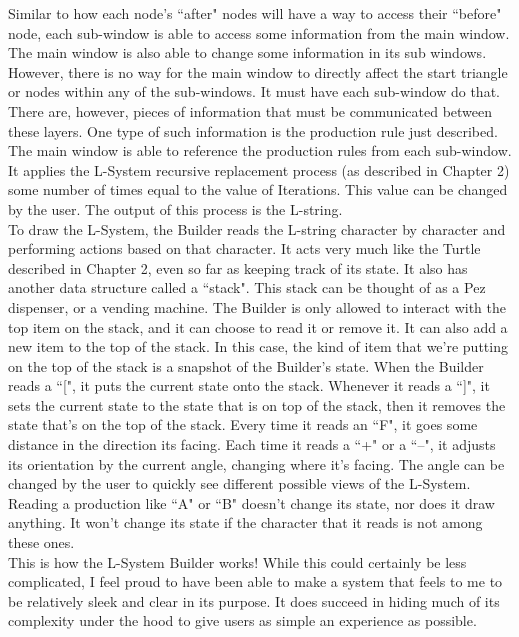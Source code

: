 \documentclass[12pt,twoside]{reedthesis}
\begin{document}
	Similar to how each node's ``after" nodes will have a way to access their ``before" node, each sub-window is able to access some information from the main window. The main window is also able to change some information in its sub windows. However, there is no way for the main window to directly affect the start triangle or nodes within any of the sub-windows. It must have each sub-window do that. There are, however, pieces of information that must be communicated between these layers. One type of such information is the production rule just described. The main window is able to reference the production rules from each sub-window. It applies the L-System recursive replacement process (as described in Chapter 2) some number of times equal to the value of Iterations. This value can be changed by the user. The output of this process is the L-string.\\
	
	To draw the L-System, the Builder reads the L-string character by character and performing actions based on that character. It acts very much like the Turtle described in Chapter 2, even so far as keeping track of its state. It also has another data structure called a ``stack". This stack can be thought of as a Pez dispenser, or a vending machine. The Builder is only allowed to interact with the top item on the stack, and it can choose to read it or remove it. It can also add a new item to the top of the stack. In this case, the kind of item that we're putting on the top of the stack is a snapshot of the Builder's state. When the Builder reads a ``[", it puts the current state onto the stack. Whenever it reads a ``]", it sets the current state to the state that is on top of the stack, then it removes the state that's on the top of the stack. Every time it reads an ``F", it goes some distance in the direction its facing. Each time it reads a ``+" or a ``–", it adjusts its orientation by the current angle, changing where it's facing. The angle can be changed by the user to quickly see different possible views of the L-System. Reading a production like ``A" or ``B" doesn't change its state, nor does it draw anything. It won't change its state if the character that it reads is not among these ones.\\
	
	This is how the L-System Builder works! While this could certainly be less complicated, I feel proud to have been able to make a system that feels to me to be relatively sleek and clear in its purpose. It does succeed in hiding much of its complexity under the hood to give users as simple an experience as possible. 
\end{document}
